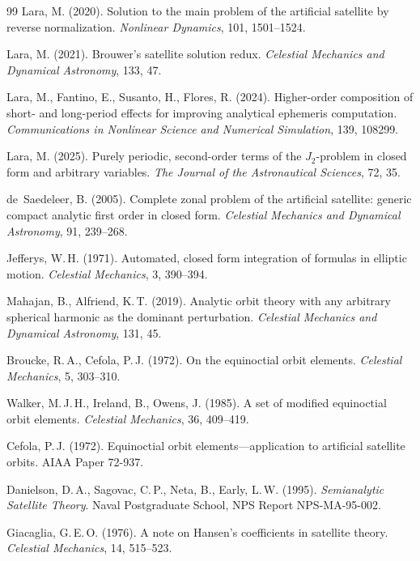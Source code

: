 \documentclass[11pt]{article}
\begin{document}
\begin{thebibliography}{99}
Lara, M. (2020).
Solution to the main problem of the artificial satellite by reverse
normalization.
\textit{Nonlinear Dynamics}, 101, 1501--1524.

Lara, M. (2021).
Brouwer's satellite solution redux.
\textit{Celestial Mechanics and Dynamical Astronomy}, 133, 47.

Lara, M., Fantino, E., Susanto, H., Flores, R. (2024).
Higher-order composition of short- and long-period effects for improving
analytical ephemeris computation.
\textit{Communications in Nonlinear Science and Numerical Simulation},
139, 108299.

Lara, M. (2025).
Purely periodic, second-order terms of the $J_2$-problem in closed form
and arbitrary variables.
\textit{The Journal of the Astronautical Sciences}, 72, 35.


de~Saedeleer, B. (2005).
Complete zonal problem of the artificial satellite: generic compact
analytic first order in closed form.
\textit{Celestial Mechanics and Dynamical Astronomy}, 91, 239--268.

Jefferys, W.\,H. (1971).
Automated, closed form integration of formulas in elliptic motion.
\textit{Celestial Mechanics}, 3, 390--394.

Mahajan, B., Alfriend, K.\,T. (2019).
Analytic orbit theory with any arbitrary spherical harmonic as the
dominant perturbation.
\textit{Celestial Mechanics and Dynamical Astronomy}, 131, 45.


Broucke, R.\,A., Cefola, P.\,J. (1972).
On the equinoctial orbit elements.
\textit{Celestial Mechanics}, 5, 303--310.

Walker, M.\,J.\,H., Ireland, B., Owens, J. (1985).
A set of modified equinoctial orbit elements.
\textit{Celestial Mechanics}, 36, 409--419.

Cefola, P.\,J. (1972).
Equinoctial orbit elements---application to artificial satellite orbits.
AIAA Paper 72-937.

Danielson, D.\,A., Sagovac, C.\,P., Neta, B., Early, L.\,W. (1995).
\textit{Semianalytic Satellite Theory}.
Naval Postgraduate School, NPS Report NPS-MA-95-002.

Giacaglia, G.\,E.\,O. (1976).
A note on Hansen's coefficients in satellite theory.
\textit{Celestial Mechanics}, 14, 515--523.


\end{thebibliography}
\end{document}
